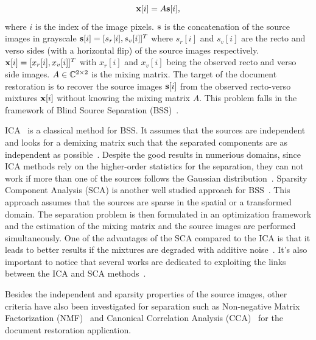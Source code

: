 \documentclass[conference]{IEEEtran}
\theoremstyle{plain}
\begin{document}
\begin{equation}
\label{eq: linear mixing}
\bx[i] = A \bs[i],
\end{equation}
where $i$ is the index of the image pixels. ${\mathbf s}$ is the concatenation of the source images in grayscale ${\mathbf s}[i] = [s_r[i], s_v[i]]^T$ where $s_r[i]$ and $s_v[i]$ are the recto and verso sides (with a horizontal flip) of the source images respectively. ${\mathbf x}[i] = [x_r[i], x_v[i]]^T$ with $x_r[i]$ and $x_v[i]$ being the observed recto and verso side images. $A\in\mathbb C^{2 \times 2}$ is the mixing matrix. The target of the document restoration is to recover the source images ${\mathbf s}[i]$ from the observed recto-verso mixtures ${\mathbf x}[i]$ without knowing the mixing matrix $A$. This problem falls in the framework of Blind Source Separation (BSS)~\cite{comon2010handbook}.


ICA~\cite{hyvarinen2004independent} is a classical method for BSS. It assumes that the sources are independent and looks for a demixing matrix such that the separated components are as independent as possible~\cite{tonazzini2004independent}. Despite the good results in numerious domains, since ICA methods rely on the higher-order statistics for the separation, they can not work if more than one of the sources follows the Gaussian distribution~\cite{nordhausen2018independent}. Sparsity Component Analysis (SCA) is another well studied approach for BSS~\cite{souidene2007blind, zibulevsky2001blind,bobin2007sparsity}. This approach assumes that the sources are sparse in the spatial or a transformed domain. The separation problem is then formulated in an optimization framework and the estimation of the mixing matrix and the source images are performed simultaneously. One of the advantages of the SCA compared to the ICA is that it leads to better results if the mixtures are degraded with additive noise~\cite{bobin2007sparsity}. It's also important to notice that several works are dedicated to exploiting the links between the ICA and SCA methods~\cite{feng2018revisiting,bronstein2005sparse,boukouvalas2018sparsity}.

Besides the independent and sparsity properties of the source images, other criteria have also been investigated for separation such as Non-negative Matrix Factorization (NMF)~\cite{merrikh2010using} and Canonical Correlation Analysis (CCA)~\cite{boccuto2019blind} for the document restoration application. 
\end{document}

